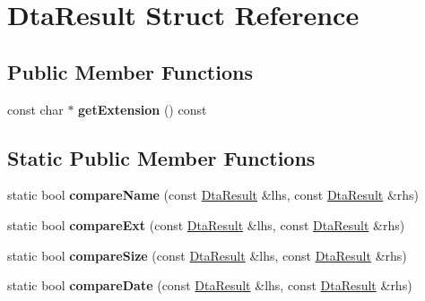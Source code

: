 \hypertarget{structDtaResult}{\section{Dta\-Result Struct Reference}
\label{structDtaResult}
}
\subsection*{Public Member Functions}
\begin{DoxyCompactItemize}
\item 
\hypertarget{structDtaResult_a6f67f37832a4ad25e67913784dab84ef}{const char $\ast$ {\bfseries get\-Extension} () const }\label{structDtaResult_a6f67f37832a4ad25e67913784dab84ef}

\end{DoxyCompactItemize}
\subsection*{Static Public Member Functions}
\begin{DoxyCompactItemize}
\item 
\hypertarget{structDtaResult_a049b082be8ef1a735478fec0b39c9c71}{static bool {\bfseries compare\-Name} (const \hyperlink{structDtaResult}{Dta\-Result} \&lhs, const \hyperlink{structDtaResult}{Dta\-Result} \&rhs)}\label{structDtaResult_a049b082be8ef1a735478fec0b39c9c71}

\item 
\hypertarget{structDtaResult_af413af08afafef36ba90f36404587473}{static bool {\bfseries compare\-Ext} (const \hyperlink{structDtaResult}{Dta\-Result} \&lhs, const \hyperlink{structDtaResult}{Dta\-Result} \&rhs)}\label{structDtaResult_af413af08afafef36ba90f36404587473}

\item 
\hypertarget{structDtaResult_a149b47dfce52831f46edc89a46891095}{static bool {\bfseries compare\-Size} (const \hyperlink{structDtaResult}{Dta\-Result} \&lhs, const \hyperlink{structDtaResult}{Dta\-Result} \&rhs)}\label{structDtaResult_a149b47dfce52831f46edc89a46891095}

\item 
\hypertarget{structDtaResult_a7abe980d46eebd0509f34978778be3f9}{static bool {\bfseries compare\-Date} (const \hyperlink{structDtaResult}{Dta\-Result} \&lhs, const \hyperlink{structDtaResult}{Dta\-Result} \&rhs)}\label{structDtaResult_a7abe980d46eebd0509f34978778be3f9}

\end{DoxyCompactItemize}
